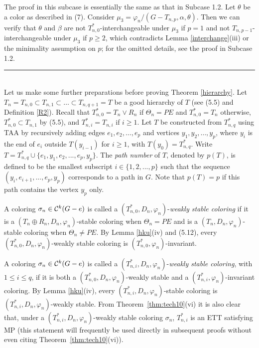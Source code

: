 \documentclass[11pt]{article}
\def\qed{\hfill \rule{4pt}{7pt}}
\begin{document}
The proof in this subcase is essentially the same as that in Subcase 1.2.  Let $\theta$ be a color as described in
(7). Consider $\mu_3=\varphi_n/(G-T_{n,p}, \alpha,\theta)$. Then we can verify that $\theta$ and $\beta$ are not $T_{n,0}^*$-interchangeable under $\mu_3$ if $p=1$ and not $T_{n,p-1}$-interchangeable under $\mu_3$ if $p\ge 2$, which contradicts 
Lemma \ref{interchange}(iii) or the minimality assumption on $p$; for the omitted details, see the proof in Subcase 1.2. \qed \\

Let us make some further preparations before proving Theorem \ref{hierarchy}. Let $T_n=T_{n,0} \subset T_{n,1} \subset 
\ldots \subset T_{n,q+1}=T$ be a good hierarchy of $T$ (see (5.5) and Definition \ref{R2}). Recall that $T_{n,0}^*= 
T_{n}\vee R_n$ if $\Theta_n=PE$ and $T_{n,0}^*= T_{n}$ otherwise, $T_{n,0}^* \subset T_{n,1}$ by (5.5), and $T_{n,i}^*=T_{n,i}$ 
if $i \ge 1$. Let $T$ be constructed from $T_{n,q}^*$ using TAA by recursively adding edges 
$e_1,e_2, \ldots, e_p$ and vertices $y_1,y_2, \ldots, y_p$, where $y_i$ is the end of $e_i$ outside 
$T(y_{i-1})$ for $i\ge 1$, with $T(y_0)=T_{n,q}^*$. Write $T=T_{n,q}^* \cup\{e_1,y_1,e_2,...,e_p,y_p\}$.  The {\em path number}\label{pathnumber} 
of $T$, denoted by $p(T)$, is defined to be the smallest subscript $i\in \{1,2,...,p\}$ such that the sequence $(y_i,e_{i+1},...,e_p,y_p)$ corresponds 
to a path in $G$. Note that $p(T)=p$ if this path contains the vertex $y_p$ only.

A coloring $\sigma_n \in {\cal C}^k(G-e)$ is called a $(T_{n,0}^*, D_n,\varphi_n)$-{\em weakly stable coloring}\label{t0strong}
if it is a $(T_n\oplus R_n,D_n,\varphi_n)$-stable coloring when $\Theta_n=PE$ and is a $(T_n,D_n,\varphi_n)$-stable 
coloring when $\Theta_n \ne PE$.  By Lemma \ref{hku}(iv) and (5.12), every $(T_{n,0}^*, D_n,\varphi_n)$-weakly stable 
coloring is $(T_{n,0}^*, \varphi_n)$-invariant.    

A coloring $\sigma_n \in {\cal C}^k(G-e)$ is called a $(T_{n,i}^*, D_n, \varphi_n)$-{\em weakly stable coloring}\label{tistrong}, with
$1 \le i \le q$, if it is both a $(T_{n,0}^*, D_n, \varphi_n)$-weakly stable and a $(T_{n,i}^*,\varphi_n)$-invariant coloring. 
By Lemma \ref{hku}(iv), every $(T_{n,i}^*, D_n, \varphi_n)$-stable coloring is $(T_{n,i}^*, D_n, \varphi_n)$-weakly stable. 
From Theorem~\ref{thm:tech10}(vi) it is also clear that, under a $(T_{n,i}^*, D_n, \varphi_n)$-weakly stable coloring $\sigma_n$, 
$T^*_{n,i}$ is an ETT satisfying MP (this statement will frequently be used directly in subsequent proofs without even 
citing Theorem~\ref{thm:tech10}(vi)). 
\end{document}
